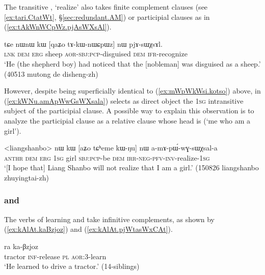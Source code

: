 The transitive  , `realize' also takes finite complement clauses  (see \ref{ex:tari.CtatWt}, §\ref{sec:redundant.AM}) or participial clauses as in (\ref{ex:tAkWnWCpWz.pjAsWXsAl}).

\begin{exe}
\ex \label{ex:tAkWnWCpWz.pjAsWXsAl}
 \gll tɕe nɯnɯ kɯ [qaʑo tɤ-kɯ-nɯɕpɯz] nɯ pjɤ-sɯχsɤl. \\
 \textsc{lnk} \textsc{dem} \textsc{erg} sheep \textsc{aor}-\textsc{sbj}:\textsc{pcp}-disguised \textsc{dem} \textsc{ifr}-recognize \\
\glt `He (the shepherd boy) had noticed that the [nobleman] was disguised as a sheep.' (40513 mutong de disheng-zh)
\end{exe}

However, despite being superficially identical to (\ref{ex:mWpWkWsi.kotso}) above, in (\ref{ex:kWNu.amApWwGsWXsala})  selects as direct object the \textsc{1sg}  intransitive subject  of the participial clause. A possible way to explain this observation is to analyze the participial clause  as a relative clause whose head is   (`me who am a girl').
 
\begin{exe}
\ex \label{ex:kWNu.amApWwGsWXsala}
 \gll <liangshanbo> nɯ kɯ [aʑo tɕʰeme kɯ-ŋu] nɯ a-mɤ-pɯ́-wɣ-sɯχsal-a \\
  \textsc{anthr} \textsc{dem} \textsc{erg} \textsc{1sg} girl \textsc{sbj}:\textsc{pcp}-be \textsc{dem} \textsc{irr}-\textsc{neg}-\textsc{pfv}-\textsc{inv}-realize-\textsc{1sg} \\
 \glt `[I hope that] Liang Shanbo will not realize that I am a girl.' (150826 liangshanbo zhuyingtai-zh)
 \end{exe}

 
 \subsubsection{ and } \label{sec:Bzjoz.sWxCAt.complement}
 The verbs of learning  and  take infinitive complements, as shown by (\ref{ex:kAlAt.kaBzjoz}) and (\ref{ex:kAlAt.pjWtasWxCAt}).
 
\begin{exe}
\ex \label{ex:kAlAt.kaBzjoz}
  ra ka-βzjoz \\
 tractor \textsc{inf}-release \textsc{pl} \textsc{aor}:3\flobv{}-learn \\
 \glt  `He learned to drive a tractor.' (14-siblings)
 \end{exe}

